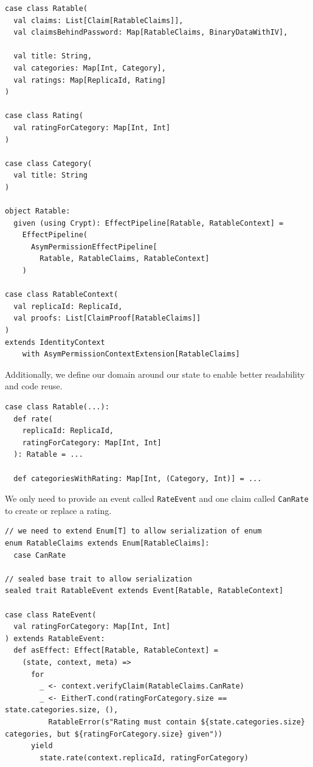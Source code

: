 \documentclass[
	english,
	ruledheaders=section,   %
	class=report,		    %
	thesis={type=bachelor}, %
	accentcolor=9c,			%
	custommargins=true,    %
	marginpar=false,        %
	parskip=half-,          %
	fontsize=11pt,          %
]{tudapub}
\begin{document}
\begin{lstlisting}
case class Ratable(
  val claims: List[Claim[RatableClaims]],
  val claimsBehindPassword: Map[RatableClaims, BinaryDataWithIV],

  val title: String,
  val categories: Map[Int, Category],
  val ratings: Map[ReplicaId, Rating]
)

case class Rating(
  val ratingForCategory: Map[Int, Int]
)

case class Category(
  val title: String
)

object Ratable:
  given (using Crypt): EffectPipeline[Ratable, RatableContext] = 
    EffectPipeline(
      AsymPermissionEffectPipeline[
        Ratable, RatableClaims, RatableContext]
    )

case class RatableContext(
  val replicaId: ReplicaId,
  val proofs: List[ClaimProof[RatableClaims]]
) 
extends IdentityContext 
    with AsymPermissionContextExtension[RatableClaims]
\end{lstlisting}

Additionally, we define our domain around our state to enable better readability and code reuse.

\begin{lstlisting}
case class Ratable(...):
  def rate(
    replicaId: ReplicaId, 
    ratingForCategory: Map[Int, Int]
  ): Ratable = ...

  def categoriesWithRating: Map[Int, (Category, Int)] = ...
\end{lstlisting}

We only need to provide an event called \texttt{RateEvent} and one claim called \texttt{CanRate} to create or replace a rating.

\begin{lstlisting}
// we need to extend Enum[T] to allow serialization of enum
enum RatableClaims extends Enum[RatableClaims]:
  case CanRate

// sealed base trait to allow serialization
sealed trait RatableEvent extends Event[Ratable, RatableContext]

case class RateEvent(
  val ratingForCategory: Map[Int, Int]
) extends RatableEvent:
  def asEffect: Effect[Ratable, RatableContext] =
    (state, context, meta) =>
      for
        _ <- context.verifyClaim(RatableClaims.CanRate)
        _ <- EitherT.cond(ratingForCategory.size == state.categories.size, (),
          RatableError(s"Rating must contain ${state.categories.size} categories, but ${ratingForCategory.size} given"))
      yield
        state.rate(context.replicaId, ratingForCategory)
\end{lstlisting}
\end{document}
